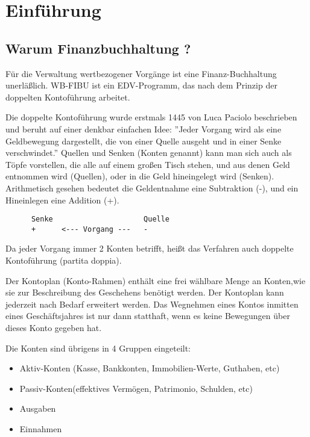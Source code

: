 \documentclass[12pt]{report}
\begin{document}
\tableofcontents

\chapter{Einführung}

\section{Warum Finanzbuchhaltung ?}

Für die Verwaltung wertbezogener Vorgänge ist eine Finanz-Buchhaltung
unerläßlich. WB-FIBU ist ein EDV-Programm, das nach dem Prinzip der doppelten
Kontoführung arbeitet.

Die doppelte Kontoführung wurde erstmals 1445 von Luca Paciolo beschrieben und
beruht auf einer denkbar einfachen Idee: ''Jeder Vorgang wird als eine
Geldbewegung dargestellt, die von einer Quelle ausgeht und in einer Senke
verschwindet.'' Quellen und Senken (Konten genannt) kann man sich auch als
Töpfe vorstellen, die alle auf einem großen Tisch stehen, und aus denen Geld
entnommen wird (Quellen), oder in die Geld hineingelegt wird (Senken).
Arithmetisch gesehen bedeutet die Geldentnahme eine Subtraktion (-), und ein
Hineinlegen eine Addition (+).  

\begin{verbatim}
      Senke                     Quelle
      +      <--- Vorgang ---   -
\end{verbatim}

Da jeder Vorgang immer 2 Konten betrifft, heißt das Verfahren auch doppelte
Kontoführung (partita doppia).

Der Kontoplan (Konto-Rahmen) enthält eine frei wählbare Menge an Konten,wie
sie zur Beschreibung des Geschehens benötigt werden. Der Kontoplan kann
jederzeit nach Bedarf erweitert werden. Das Wegnehmen eines Kontos inmitten
eines Geschäftsjahres ist nur dann statthaft, wenn es keine Bewegungen über
dieses Konto gegeben hat.

Die Konten sind übrigens in 4 Gruppen eingeteilt:

\begin{itemize}

\item Aktiv-Konten (Kasse, Bankkonten, Immobilien-Werte, Guthaben, etc)

\item Passiv-Konten(effektives Vermögen, Patrimonio, Schulden, etc)

\item Ausgaben

\item Einnahmen

\end{itemize}
\end{document}

